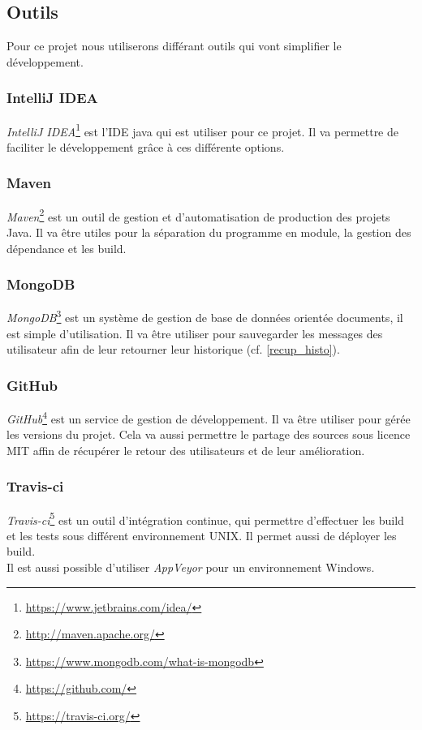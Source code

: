 \documentclass[12pt]{article}
\begin{document}
\subsection{Outils}
Pour ce projet nous utiliserons différant outils qui vont simplifier le développement.


\subsubsection{IntelliJ IDEA}
\textit{IntelliJ IDEA}\footnote{\url{https://www.jetbrains.com/idea/}} est l'IDE java qui est utiliser pour ce projet. Il va permettre de faciliter le développement grâce à ces différente options.


\subsubsection{Maven}
\textit{Maven}\footnote{\url{http://maven.apache.org/}} est un outil de gestion et d'automatisation de production des projets Java. Il va être utiles pour la séparation du programme en module, la gestion des dépendance et les build.

\subsubsection{MongoDB}
\textit{MongoDB}\footnote{\url{https://www.mongodb.com/what-is-mongodb}} est un système de gestion de base de données orientée documents, il est simple d'utilisation. Il va être utiliser pour sauvegarder les messages des utilisateur afin de leur retourner leur historique (cf. \ref{recup_histo}).

\subsubsection{GitHub}
\textit{GitHub}\footnote{\url{https://github.com/}} est un service de gestion de développement. Il va être utiliser pour gérée les versions du projet. Cela va aussi permettre le partage des sources sous licence MIT affin de récupérer le retour des utilisateurs et de leur amélioration.

\subsubsection{Travis-ci}
\textit{Travis-ci}\footnote{\url{https://travis-ci.org/}} est un outil d'intégration continue, qui permettre d'effectuer les build et les tests sous différent environnement UNIX. Il permet aussi de déployer les build.\\
Il est aussi possible d'utiliser \textit{AppVeyor} pour un environnement Windows.
\end{document}
